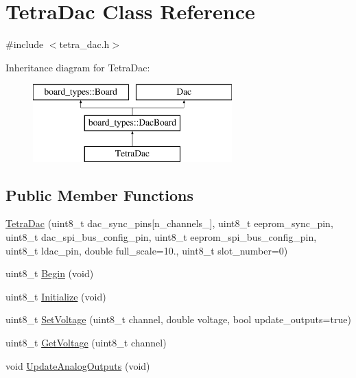 \hypertarget{classTetraDac}{}\section{Tetra\+Dac Class Reference}
\label{classTetraDac}


{\ttfamily \#include $<$tetra\+\_\+dac.\+h$>$}

Inheritance diagram for Tetra\+Dac\+:\begin{figure}[H]
\begin{center}
\leavevmode
\includegraphics[height=3.000000cm]{classTetraDac}
\end{center}
\end{figure}
\subsection*{Public Member Functions}
\begin{DoxyCompactItemize}
\item 
\mbox{\hyperlink{classTetraDac_a77131270e115bf47b6c582d53cddb881}{Tetra\+Dac}} (uint8\+\_\+t dac\+\_\+sync\+\_\+pins\mbox{[}n\+\_\+channels\+\_\+\mbox{]}, uint8\+\_\+t eeprom\+\_\+sync\+\_\+pin, uint8\+\_\+t dac\+\_\+spi\+\_\+bus\+\_\+config\+\_\+pin, uint8\+\_\+t eeprom\+\_\+spi\+\_\+bus\+\_\+config\+\_\+pin, uint8\+\_\+t ldac\+\_\+pin, double full\+\_\+scale=10., uint8\+\_\+t slot\+\_\+number=0)
\item 
uint8\+\_\+t \mbox{\hyperlink{classTetraDac_aeee47156d6a403ccbb8183b02cca798d}{Begin}} (void)
\item 
uint8\+\_\+t \mbox{\hyperlink{classTetraDac_a57fd4d8db59603efe74c0c3902c64ae9}{Initialize}} (void)
\item 
uint8\+\_\+t \mbox{\hyperlink{classTetraDac_a265bed4317bb6b3b4c6962fa538631da}{Set\+Voltage}} (uint8\+\_\+t channel, double voltage, bool update\+\_\+outputs=true)
\item 
uint8\+\_\+t \mbox{\hyperlink{classTetraDac_a6a5206bc2e525ea820a1b3279526850c}{Get\+Voltage}} (uint8\+\_\+t channel)
\item 
void \mbox{\hyperlink{classTetraDac_ae7e2c1afbc64a8cc0ddd2ef4af0b25b3}{Update\+Analog\+Outputs}} (void)
\end{DoxyCompactItemize}
